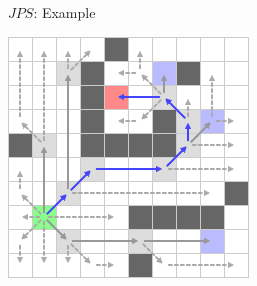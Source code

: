 \documentclass{presentation}
\begin{document}
\begin{frame}{$JPS$: Example}
\begin{minipage}{0.23\textwidth}
	\end{minipage}%
	\hfill%
	\begin{minipage}{0.23\textwidth}
		\includegraphics[width=\textwidth]{figures/jps_geschnitten/13.png}
	\end{minipage}%
\end{frame}
\end{document}
